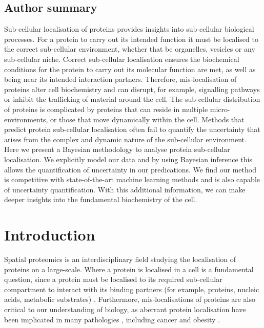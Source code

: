 \documentclass[12pt,english]{article}
\begin{document}
\subsection*{Author summary}

Sub-cellular localisation of proteins provides insights into
sub-cellular biological processes. For a protein to carry out its
intended function it must be localised to the correct sub-cellular
environment, whether that be organelles, vesicles or any sub-cellular
niche. Correct sub-cellular localisation ensures the biochemical
conditions for the protein to carry out its molecular function are
met, as well as being near its intended interaction
partners. Therefore, mis-localisation of proteins alter cell
biochemistry and can disrupt, for example, signalling pathways or
inhibit the trafficking of material around the cell. The sub-cellular
distribution of proteins is complicated by proteins that can reside in
multiple micro-environments, or those that move dynamically within the
cell. Methods that predict protein sub-cellular localisation often
fail to quantify the uncertainty that arises from the complex and
dynamic nature of the sub-cellular environment. Here we present a
Bayesian methodology to analyse protein sub-cellular localisation. We
explicitly model our data and by using Bayesian inference this allows
the quantification of uncertainty in our predications. We find our
method is competitive with state-of-the-art machine learning methods
and is also capable of uncertainty quantification. With this
additional information, we can make deeper insights into the
fundamental biochemistry of the cell.


\section{Introduction}\label{Intro}

Spatial proteomics is an interdisciplinary field studying the
localisation of proteins on a large-scale. Where a protein is
localised in a cell is a fundamental question, since a protein must be
localised to its required sub-cellular compartment to interact with
its binding partners (for example, proteins, nucleic acids, metabolic
substrates) \citep{Gibson:2009}. Furthermore, mis-localisations of
proteins are also critical to our understanding of biology, as
aberrant protein localisation have been implicated in many pathologies
\citep{Olkkonen:2006, Laurila:2009, Luheshi:2008, De:2011, Cody:2013},
including cancer \citep{Kau:2004, Rodriguez:2004, Latorre:2005,
  Shin:2013} and obesity \citep{Siljee:2018}.
\end{document}
